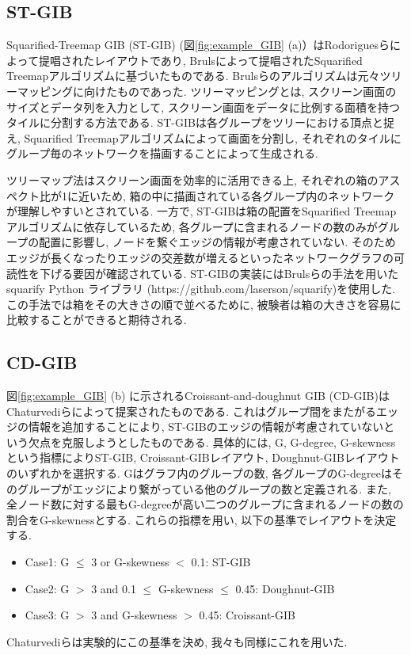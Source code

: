 \documentclass{kuee}
\begin{document}
\subsection{ST-GIB}
Squarified-Treemap GIB (ST-GIB) (図\ref{fig:example_GIB} (a)）はRodoriguesら\cite{rodrigues2011group}によって提唱されたレイアウトであり, Brulsによって提唱されたSquarified Treemapアルゴリズム\cite{bruls2000squarified}に基づいたものである.
Brulsらのアルゴリズムは元々ツリーマッピングに向けたものであった.
ツリーマッピングとは, スクリーン画面のサイズとデータ列を入力として, スクリーン画面をデータに比例する面積を持つタイルに分割する方法である\cite{shneiderman1992tree}.
ST-GIBは各グループをツリーにおける頂点と捉え, Squarified Treemapアルゴリズムによって画面を分割し, それぞれのタイルにグループ毎のネットワークを描画することによって生成される.

ツリーマップ法はスクリーン画面を効率的に活用できる上, それぞれの箱のアスペクト比が1に近いため, 箱の中に描画されている各グループ内のネットワークが理解しやすいとされている\cite{bruls2000squarified}.
一方で, ST-GIBは箱の配置をSquarified Treemapアルゴリズムに依存しているため, 各グループに含まれるノードの数のみがグループの配置に影響し, ノードを繋ぐエッジの情報が考慮されていない.
そのためエッジが長くなったりエッジの交差数が増えるといったネットワークグラフの可読性を下げる要因が確認されている.
ST-GIBの実装にはBrulsらの手法を用いたsquarify Python ライブラリ (https://github.com/laserson/squarify)を使用した.
この手法では箱をその大きさの順で並べるために, 被験者は箱の大きさを容易に比較することができると期待される.

\subsection{CD-GIB}
図\ref{fig:example_GIB} (b) に示されるCroissant-and-doughnut GIB (CD-GIB)はChaturvediら\cite{chaturvedi2014group}によって提案されたものである.
これはグループ間をまたがるエッジの情報を追加することにより, ST-GIBのエッジの情報が考慮されていないという欠点を克服しようとしたものである.
具体的には, G, G-degree, G-skewnessという指標によりST-GIB, Croissant-GIBレイアウト, Doughnut-GIBレイアウトのいずれかを選択する.
Gはグラフ内のグループの数, 各グループのG-degreeはそのグループがエッジにより繋がっている他のグループの数と定義される.
また, 全ノード数に対する最もG-degreeが高い二つのグループに含まれるノードの数の割合をG-skewnessとする.
これらの指標を用い, 以下の基準でレイアウトを決定する.
\begin{itemize}
  \item Case1: G $\le$ 3 or G-skewness $<$ 0.1: ST-GIB
  \item Case2: G $>$ 3 and 0.1 $\le$ G-skewness $\le$ 0.45: Doughnut-GIB
  \item Case3: G $>$ 3 and G-skewness $>$ 0.45: Croissant-GIB
\end{itemize}
Chaturvediらは実験的にこの基準を決め, 我々も同様にこれを用いた.
\end{document}
